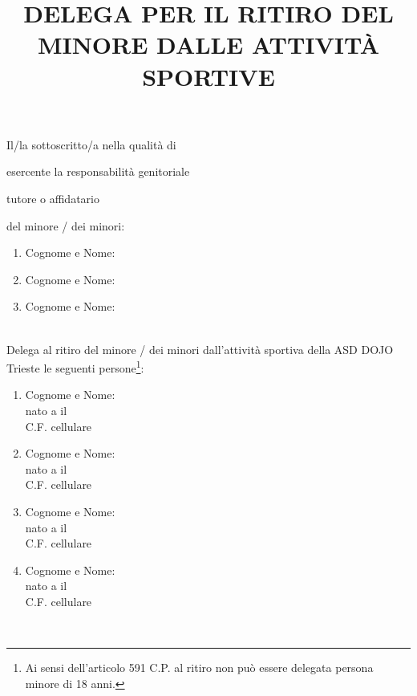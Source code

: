 \documentclass{djtsmod}
\title{DELEGA PER IL RITIRO DEL MINORE DALLE ATTIVITÀ SPORTIVE}
\begin{document}
	\maketitle
	
	Il/la sottoscritto/a \fieldfill\; nella qualità di
	\begin{radiolist}
		\item esercente la responsabilità genitoriale  
		\item tutore o affidatario
	\end{radiolist}
	del minore / dei minori: \\
	\begin{minipage}{0.8\textwidth}
		\begin{enumerate}
			\item Cognome e Nome: \fieldfill
			\item Cognome e Nome: \fieldfill
			\item Cognome e Nome: \fieldfill
		\end{enumerate}
	\end{minipage} \\[10pt]
	Delega al ritiro del minore / dei minori dall'attività sportiva della ASD DOJO Trieste le seguenti persone\footnote{Ai sensi dell'articolo 591 C.P. al ritiro non può essere delegata persona minore di 18 anni.}: \\
	\begin{minipage}{0.8\linewidth}
		\begin{enumerate}
			\item Cognome e Nome: \fieldfill \\
			nato a \field{6cm} il \fieldfill \\
			C.F. \field{6cm} cellulare \fieldfill
			\item Cognome e Nome: \fieldfill \\
			nato a \field{6cm} il \fieldfill \\
			C.F. \field{6cm} cellulare \fieldfill
			\item Cognome e Nome: \fieldfill \\
			nato a \field{6cm} il \fieldfill \\
			C.F. \field{6cm} cellulare \fieldfill
			\item Cognome e Nome: \fieldfill \\
			nato a \field{6cm} il \fieldfill \\
			C.F. \field{6cm} cellulare \fieldfill
		\end{enumerate}
	\end{minipage}\\[10pt]
\end{document}
